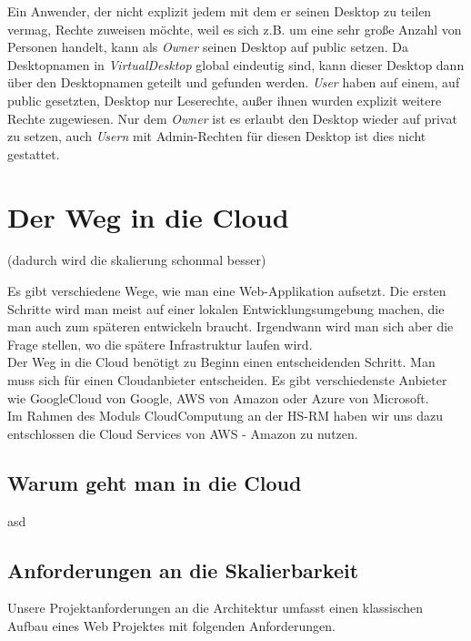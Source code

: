 \documentclass[a4paper, 12pt]{scrreprt}
\renewcommand\_{\textunderscore\allowbreak}
\begin{document}
\noindent Ein Anwender, der nicht explizit jedem mit dem er seinen Desktop zu teilen vermag, Rechte zuweisen möchte, weil es sich z.B. um eine sehr große Anzahl von Personen handelt, kann als \textit{Owner} seinen Desktop auf public setzen.
Da Desktopnamen in \textit{VirtualDesktop} global eindeutig sind, kann dieser Desktop dann über den Desktopnamen geteilt und gefunden werden.
\textit{User} haben auf einem, auf public gesetzten, Desktop nur Leserechte, außer ihnen wurden explizit weitere Rechte zugewiesen. 
Nur dem \textit{Owner} ist es erlaubt den Desktop wieder auf privat zu setzen, auch \textit{Usern} mit Admin-Rechten für diesen Desktop ist dies nicht gestattet.

\chapter{Der Weg in die Cloud}
(dadurch wird die skalierung schonmal besser)

Es gibt verschiedene Wege, wie man eine Web-Applikation aufsetzt. Die ersten Schritte wird man meist auf einer lokalen Entwicklungsumgebung machen, die man auch zum späteren entwickeln braucht. Irgendwann wird man sich aber die Frage stellen, wo die spätere Infrastruktur laufen wird. \\
Der Weg in die Cloud benötigt zu Beginn einen entscheidenden Schritt. Man muss sich für einen Cloudanbieter entscheiden. Es gibt verschiedenste Anbieter wie GoogleCloud von Google, AWS von Amazon oder Azure von Microsoft. \\
Im Rahmen des Moduls CloudComputung an der HS-RM haben wir uns dazu entschlossen die Cloud Services von AWS - Amazon zu nutzen.
\section{Warum geht man in die Cloud}
asd
\section{Anforderungen an die Skalierbarkeit}
Unsere Projektanforderungen an die Architektur umfasst einen klassischen Aufbau eines Web Projektes mit folgenden Anforderungen. \\
\end{document}
